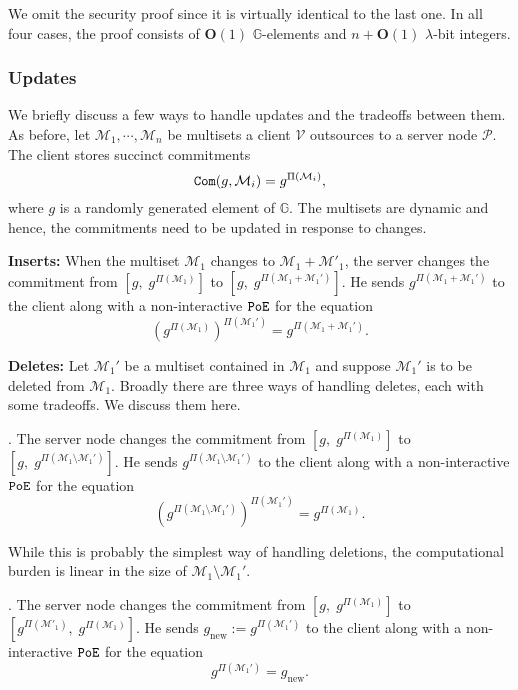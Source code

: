 \documentclass[11pt, lettersize, notitlepage, leqno, footskip=0.6cm]{article}
\newcommand{\ttt}{\texttt}
\newcommand{\bG}{\mathbb{G}}
\newcommand{\pr}{\protect}
\newcommand{\mc}{\mathcal}
\newcommand{\mbf}{\mathbf}
\newcommand{\mr}{\mathrm}
\newcommand{\sm}{\setminus}
\newcommand{\lam}{\lambda}
\newcommand{\bO}{\mbf{O}}
\newcommand{\mP}{\mc{P}}
\newcommand{\V}{\mc{V}}
\newcommand{\vs}{\vspace{-0.15cm}}
\newcommand{\noin}{\noindent}
\numberwithin{equation}{section}
\begin{document}
We omit the security proof since it is virtually identical to the last one. In all four cases, the proof consists of $\bO(1)$ $\bG$-elements and $n+\bO(1)$ $\lam$-bit integers.


\subsubsection{\fontsize{11}{11}\selectfont Updates}

We briefly discuss a few ways to handle updates and the tradeoffs between them. As before, let $\mc{M}_1,\cdots, \mc{M}_n$ be multisets a client $\V$ outsources to a server node $\mP$. The client stores succinct commitments \vs $$\pr{\ttt{Com}}(g, \mc{M}_i) = g^{\Pi(\mc{M}_i)},$$ where $g$ is a randomly generated element of $\bG$. The multisets are dynamic and hence, the commitments need to be updated in response to changes. \vspace{0.15cm}

\noin \textbf{Inserts:} When the multiset $\mc{M}_1$ changes to $\mc{M}_1+\mc{M}'_1$, the server changes the commitment from $[g,\; g^{\Pi(\mc{M}_1)}]$ to $[g,\;g^{\Pi(\mc{M}_1+\mc{M}_1')}]$. He sends $g^{\Pi(\mc{M}_1+\mc{M}_1')}$ to the client along with a non-interactive $\tt{PoE}$ for the equation \vs $$(g^{\Pi(\mc{M}_1)})^{\Pi(\mc{M}_1')} =   g^{\Pi(\mc{M}_1+\mc{M}_1')}.$$  

\noin \textbf{Deletes:} Let $\mc{M}_1'$ be a multiset contained in $\mc{M}_1$ and suppose $\mc{M}_1'$ is to be deleted from $\mc{M}_1$. Broadly there are three ways of handling deletes, each with some tradeoffs. We discuss them here. \vspace{0.1cm}

\noin 1. The server node changes the commitment from $[g,\; g^{\Pi(\mc{M}_1)}]$ to $[g,\;g^{\Pi(\mc{M}_1\sm\mc{M}_1')}]$. He sends $g^{\Pi(\mc{M}_1\sm\mc{M}_1')}$ to the client along with a non-interactive $\tt{PoE}$ for the equation \vs $$(g^{\Pi(\mc{M}_1\sm\mc{M}_1')})^{\Pi(\mc{M}_1')} =   g^{\Pi(\mc{M}_1)}.$$

While this is probably the simplest way of handling deletions, the computational burden is linear in the size of $\mc{M}_1\sm\mc{M}_1'$.
\vspace{0.1cm}

\noin 2. The server node changes the commitment from $[g,\; g^{\Pi(\mc{M}_1)}]$ to $[g^{\Pi(\mc{M}'_1)},\; g^{\Pi(\mc{M}_1)}]$. He sends $g_{\mr{new}}:= g^{\Pi(\mc{M}_1')}$ to the client along with a non-interactive $\tt{PoE}$ for the equation \vs $$g^{\Pi(\mc{M}_1')} =   g_{\mr{new}}.$$
\end{document}
